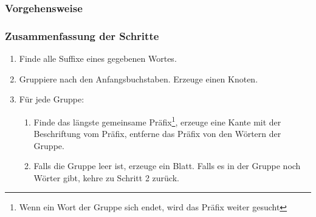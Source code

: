 \documentclass{beamer}
\begin{document}
\begin{frame}[t]
\begin{figure}
\end{figure}
\end{frame}

\subsubsection{Vorgehensweise}

\begin{frame}[t]
\frametitle{Zusammenfassung der Schritte}
\begin{enumerate}
    \item Finde alle Suffixe eines gegebenen Wortes.
    \item Gruppiere nach den Anfangsbuchstaben. Erzeuge einen Knoten.
    \item Für jede Gruppe:
    \begin{enumerate}
        \item Finde das längste gemeinsame Präfix\footnote{Wenn ein Wort der Gruppe sich endet, wird das Präfix weiter gesucht}, erzeuge eine Kante mit der Beschriftung vom Präfix, entferne das Präfix von den Wörtern der Gruppe.
        \item Falls die Gruppe leer ist, erzeuge ein Blatt. Falls es in der Gruppe noch Wörter gibt, kehre zu Schritt 2 zurück.
    \end{enumerate}
\end{enumerate}
\end{frame}
\end{document}
